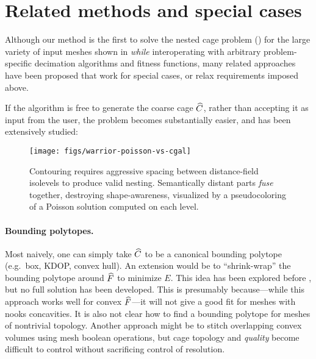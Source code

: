 \section{Related methods and special cases}

Although our method is the first to solve the nested cage problem () for the large
variety of input meshes shown in  \emph{while} interoperating
with arbitrary problem-specific decimation algorithms and fitness functions,
many related approaches have been proposed that work for special cases, or
relax requirements imposed above.

If the algorithm is free to generate the coarse cage $\widehat{C}$, rather than
accepting it as input from the user, the problem becomes substantially easier,
and has been extensively studied:
%
\begin{figure}[b]
\texttt{[image: figs/warrior-poisson-vs-cgal]}
\caption{Contouring requires aggressive spacing between distance-field
isolevels to produce valid nesting. Semantically distant parts \emph{fuse}
together, destroying shape-awareness, visualized by a pseudocoloring of a
Poisson solution computed on each level.} \label{fig:warrior-poisson}
\end{figure}

\paragraph{Bounding polytopes.}
%
Most naively, one can simply take $\widehat{C}$ to be a canonical bounding polytope
(e.g.\ box, KDOP, convex hull). An extension would be to ``shrink-wrap'' the
bounding polytope around $\widehat{F}$ to minimize $E$. This idea has been explored
before \cite{Peterhans:2012,Wang:2013:HPE}, but no full solution has been
developed.
%
This is presumably because---while this approach works well for convex
$\widehat{F}$---it will not give a good fit for meshes with nooks concavities. It is
also not clear how to find a bounding polytope for meshes of nontrivial
topology.
%
Another approach might be to stitch overlapping convex volumes
\cite{Xian:2012tv} using mesh boolean operations, but cage topology and
\emph{quality} become difficult to control without sacrificing control of
resolution.

